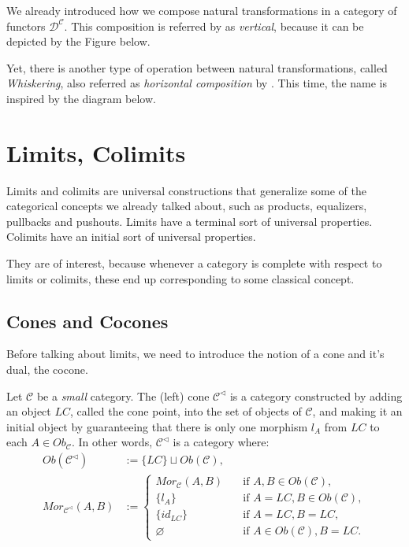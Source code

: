 We already introduced how we compose natural transformations in
a category of functors $\mathcal D^{\mathcal C}$. This composition
is referred by \citet{spivak2014category} as \textit{vertical}, because
it can be depicted by the Figure below.

Yet, there is another type of operation between natural transformations,
called \textit{Whiskering}, also referred as \textit{horizontal composition}
by \citet{spivak2014category}. This time, the name is inspired by
the diagram below.

\begin{definition}
\end{definition}

\newpage
\section{Limits, Colimits}

Limits and colimits are universal constructions that generalize some of the
categorical concepts we already talked about, such as products,
equalizers, pullbacks and pushouts.
Limits have a terminal sort of universal properties.
Colimits have an initial sort of universal properties.

They are of interest, because whenever a category is complete with
respect to limits or colimits, these end up corresponding to some
classical concept.

\subsection{Cones and Cocones}

Before talking about limits, we need to introduce the notion of a cone and it's dual, the cocone.

\begin{definition}[Cone]
  Let $\mathcal C$ be a \textit{small} category. The (left) cone $\mathcal C^{\lhd}$ is a category constructed
  by adding an object $LC$, called the cone point, into the set of objects of $\mathcal C$,
  and making it an initial object by guaranteeing that there is only one morphism $l_A$ from $LC$ to each
  $A \in Ob_\mathcal C$. In other words, $\mathcal C^{\lhd}$ is a category where:
  \begin{align*}
    Ob(\mathcal C^{\lhd}) &:= \{LC\} \sqcup Ob(\mathcal C),\\
    Mor_{\mathcal C^{\lhd}}(A,B) &:=
    \begin{cases}
      Mor_\mathcal C (A,B)  \quad &\text{if } A,B \in Ob(\mathcal C), \\
      \{l_A\}  \quad &\text{if } A = LC, B \in Ob(\mathcal C), \\
      \{id_{LC}\}  \quad &\text{if } A = LC, B = LC, \\
      \varnothing \quad &\text{if } A \in Ob(\mathcal C), B = LC.
    \end{cases}
  \end{align*}
\end{definition}

